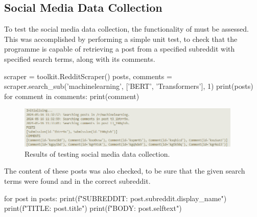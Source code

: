     \subsection{Social Media Data Collection}
    To test the social media data collection, the functionality of  must be assessed. This was accomplished by performing a simple unit test, to check that the programme is capable of retrieving a post from a specified subreddit with specified search terms, along with its comments.
    \begin{python}
scraper = toolkit.RedditScraper()
posts, comments = scraper.search_sub('machinelearning', ['BERT', 'Transformers'], 1)
print(posts)
for comment in comments:
    print(comment)
    \end{python}

    \FloatBarrier
    \begin{figure}[h]
        \centering
        \includegraphics[width=0.95\textwidth]{figures/scrape-test.png}
        \caption{Results of testing social media data collection.}
    \end{figure}
    \FloatBarrier

    The content of these posts was also checked, to be sure that the given search terms were found and in the correct subreddit.

    \begin{python}
for post in posts:
    print(f"SUBREDDIT: {post.subreddit.display_name}")
    print(f"TITLE: {post.title}")
    print(f"BODY: {post.selftext}")
    \end{python}

